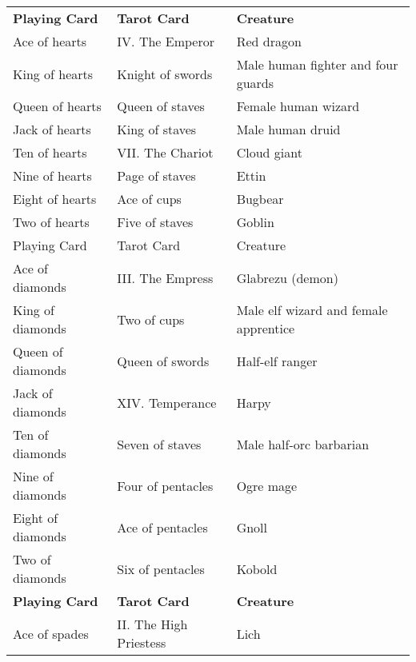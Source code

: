 \begin{tabular}{lll}
\textbf{Playing Card}  & \textbf{Tarot Card}    & \textbf{Creature}                       \\
Ace of hearts          & IV. The Emperor        & Red dragon                              \\
King of hearts         & Knight of swords       & Male human fighter and four guards      \\
Queen of hearts        & Queen of staves        & Female human wizard                     \\
Jack of hearts         & King of staves         & Male human druid                        \\
Ten of hearts          & VII. The Chariot       & Cloud giant                             \\
Nine of hearts         & Page of staves         & Ettin                                   \\
Eight of hearts        & Ace of cups            & Bugbear                                 \\
Two of hearts          & Five of staves         & Goblin                                  \\
Playing Card           & Tarot Card             & Creature                                \\
Ace of diamonds        & III. The Empress       & Glabrezu (demon)                        \\
King of diamonds       & Two of cups            & Male elf wizard and female apprentice   \\
Queen of diamonds      & Queen of swords        & Half-elf ranger                         \\
Jack of diamonds       & XIV. Temperance        & Harpy                                   \\
Ten of diamonds        & Seven of staves        & Male half-orc barbarian                 \\
Nine of diamonds       & Four of pentacles      & Ogre mage                               \\
Eight of diamonds      & Ace of pentacles       & Gnoll                                   \\
Two of diamonds        & Six of pentacles       & Kobold                                  \\
\textbf{Playing Card}  & \textbf{Tarot Card}    & \textbf{Creature}                       \\
Ace of spades          & II. The High Priestess & Lich                                    \\

\end{tabular}
